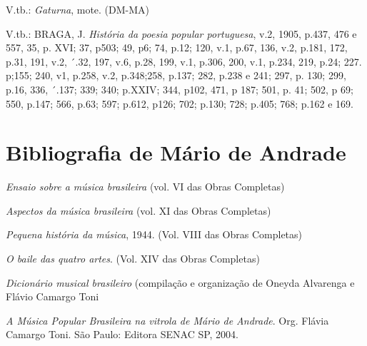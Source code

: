 V.tb.: \emph{Gaturna}, mote. (DM-MA)

V.tb.: BRAGA, J. \emph{História da poesia popular portuguesa}, v.2,
1905, p.437, 476 e 557, 35, p. XVI; 37, p503; 49, p6; 74, p.12; 120,
v.1, p.67, 136, v.2, p.181, 172, p.31, 191, v.2, ´.32, 197, v.6, p.28,
199, v.1, p.306, 200, v.1, p.234, 219, p.24; 227. p;155; 240, v1, p.258,
v.2, p.348;258, p.137; 282, p.238 e 241; 297, p. 130; 299, p.16, 336,
´.137; 339; 340; p.XXIV; 344, p102, 471, p 187; 501, p. 41; 502, p 69;
550, p.147; 566, p.63; 597; p.612, p126; 702; p.130; 728; p.405; 768;
p.162 e 169.


\chapter{Bibliografia de Mário de Andrade}

\emph{Ensaio sobre a música brasileira} (vol. VI das Obras Completas)

\emph{Aspectos da música brasileira} (vol. XI das Obras Completas)

\emph{Pequena história da música}, 1944. (Vol. VIII das Obras Completas)

\emph{O baile das quatro artes}. (Vol. XIV das Obras Completas)

\emph{Dicionário musical brasileiro} (compilação e organização de Oneyda
Alvarenga e Flávio Camargo Toni

\emph{A Música Popular Brasileira na vitrola de Mário de Andrade}. Org.
Flávia Camargo Toni. São Paulo: Editora SENAC SP, 2004.

